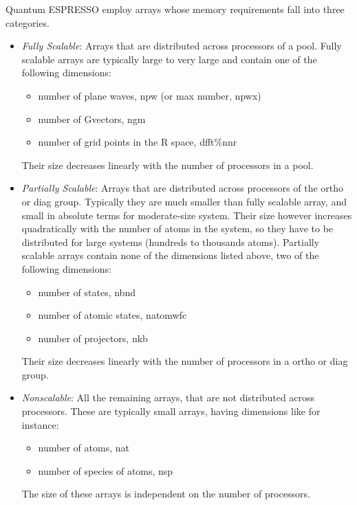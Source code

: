 \documentclass[12pt,a4paper]{article}
\begin{document}
Quantum ESPRESSO employ arrays whose memory requirements fall 
into three categories.
\begin{itemize}
\item {\em Fully Scalable}: 
Arrays that are distributed across processors of a pool.
Fully scalable arrays are typically large to very large and contain one 
of the following dimensions:
\begin{itemize}
\item number of plane waves, npw (or max number, npwx)
\item number of Gvectors, ngm
\item number of grid points in the R space, dfft\%nnr
\end{itemize}
Their size decreases linearly with the number of processors in a pool. 

\item {\em Partially Scalable}: 
Arrays that are distributed across processors of the
ortho or diag group. Typically they are much smaller than fully scalable
array, and small in absolute terms for moderate-size system. Their size
however increases quadratically with the number of atoms in the system,
so they have to be distributed for large systems (hundreds to thousands
atoms). Partially scalable arrays contain none of the dimensions listed 
above, two of the following dimensions:
\begin{itemize}
\item number of states, nbnd
\item number of atomic states, natomwfc
\item number of projectors, nkb
\end{itemize}
Their size decreases linearly with the number of processors in a ortho
or diag group. 

\item
{\em Nonscalable}: All the remaining arrays, that are not distributed across
processors. These are typically small arrays, having dimensions like for
instance:
\begin{itemize}
\item number of atoms, nat
\item number of species of atoms, nsp
\end{itemize}
The size of these arrays is independent on the number of processors.
\end{itemize}

\end{document}
